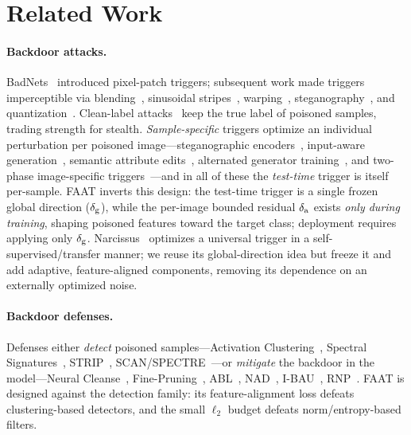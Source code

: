 \section{Related Work}
\label{sec:related}

\paragraph{Backdoor attacks.}
BadNets~\cite{gu2017badnets} introduced pixel-patch triggers; subsequent work
made triggers imperceptible via blending~\cite{chen2019blended},
sinusoidal stripes~\cite{barni2020sig}, warping~\cite{nguyen2021wanet},
steganography~\cite{li2021ssba}, and quantization~\cite{wang2022bppattack}.
Clean-label attacks~\cite{turner2018labelconsist,generalcomponents2025} keep the
true label of poisoned samples, trading strength for stealth.
\emph{Sample-specific} triggers optimize an individual perturbation per poisoned
image---steganographic encoders~\cite{li2021ssba}, input-aware
generation~\cite{nguyen2020inputaware}, semantic attribute
edits~\cite{zhu2025baat}, alternated generator
training~\cite{huynh2024combat}, and two-phase image-specific
triggers~\cite{luo2022twophase}---and in all of these the \emph{test-time}
trigger is itself per-sample. FAAT inverts this design: the test-time trigger is
a single frozen global direction ($\delta_{\mathrm{g}}$), while the per-image bounded
residual $\delta_{\mathrm{a}}$ exists \emph{only during training}, shaping poisoned features
toward the target class; deployment requires applying only $\delta_{\mathrm{g}}$.
Narcissus~\cite{zeng2023narcissus} optimizes a universal trigger in a
self-supervised/transfer manner; we reuse its global-direction idea but freeze
it and add adaptive, feature-aligned components, removing its dependence on an
externally optimized noise.

\paragraph{Backdoor defenses.}
Defenses either \emph{detect} poisoned samples---Activation
Clustering~\cite{chen2018activation}, Spectral
Signatures~\cite{tran2018spectral}, STRIP~\cite{gao2019strip},
SCAN/SPECTRE~\cite{hayase2021spectre}---or \emph{mitigate} the backdoor in the
model---Neural Cleanse~\cite{wang2019neuralcleanse},
Fine-Pruning~\cite{liu2018finepruning}, ABL~\cite{li2021abl},
NAD~\cite{li2021nad}, I-BAU~\cite{zeng2022ibau}, RNP~\cite{li2023rnp}. FAAT is
designed against the detection family: its feature-alignment loss defeats
clustering-based detectors, and the small $\ell_2$ budget defeats
norm/entropy-based filters.

